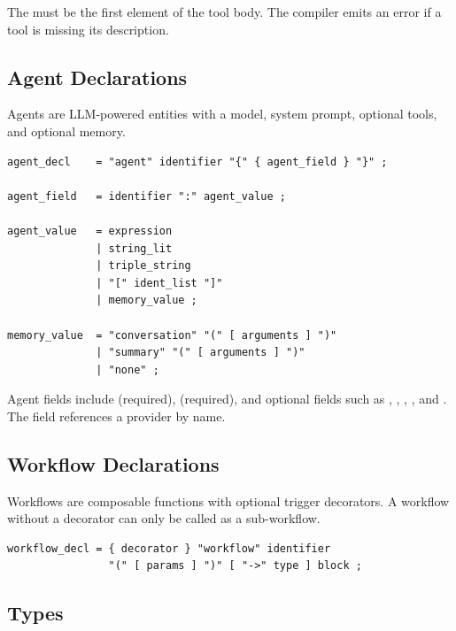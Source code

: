 \begin{note}
The  must be the first element of the tool body. The compiler emits an error if a tool is missing its description.
\end{note}

\subsection{Agent Declarations}

Agents are LLM-powered entities with a model, system prompt, optional tools, and optional memory.

\begin{lstlisting}[language=EBNF]
agent_decl    = "agent" identifier "{" { agent_field } "}" ;

agent_field   = identifier ":" agent_value ;

agent_value   = expression
              | string_lit
              | triple_string
              | "[" ident_list "]"
              | memory_value ;

memory_value  = "conversation" "(" [ arguments ] ")"
              | "summary" "(" [ arguments ] ")"
              | "none" ;
\end{lstlisting}

\begin{note}
Agent fields include  (required),  (required), and optional fields such as , , , , and . The  field references a provider by name.
\end{note}

\subsection{Workflow Declarations}

Workflows are composable functions with optional trigger decorators. A workflow without a decorator can only be called as a sub-workflow.

\begin{lstlisting}[language=EBNF]
workflow_decl = { decorator } "workflow" identifier
                "(" [ params ] ")" [ "->" type ] block ;
\end{lstlisting}

\subsection{Types}

